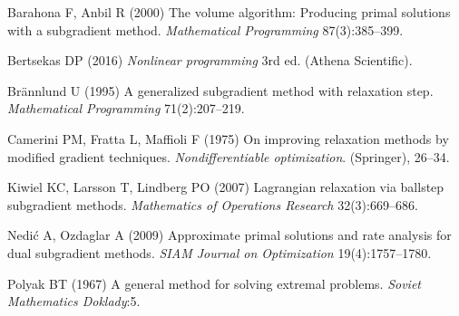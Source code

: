 \documentclass[
  a4paper,
,tablecaptionabove
]{scrartcl}
\numberwithin{equation}{section}
\begin{document}
\hypertarget{refs}{}
\begin{CSLReferences}{1}{0}
  \leavevmode\hypertarget{ref-barahona_volume_2000}{}%
  Barahona F, Anbil R (2000) The volume algorithm: Producing primal
  solutions with a subgradient method. \emph{Mathematical Programming}
  87(3):385--399.

  \leavevmode\hypertarget{ref-bertsekas_nonlinear_2016}{}%
  Bertsekas DP (2016) \emph{Nonlinear programming} 3rd ed. (Athena
  Scientific).

  \leavevmode\hypertarget{ref-brannlund1995generalized}{}%
  Brännlund U (1995) A generalized subgradient method with relaxation
  step. \emph{Mathematical Programming} 71(2):207--219.

  \leavevmode\hypertarget{ref-camerini1975improving}{}%
  Camerini PM, Fratta L, Maffioli F (1975) On improving relaxation methods
  by modified gradient techniques. \emph{Nondifferentiable optimization}.
  (Springer), 26--34.

  \leavevmode\hypertarget{ref-kiwiel_lagrangian_2007}{}%
  Kiwiel KC, Larsson T, Lindberg PO (2007) Lagrangian relaxation via
  ballstep subgradient methods. \emph{Mathematics of Operations Research}
  32(3):669--686.

  \leavevmode\hypertarget{ref-nedic_approximate_2009}{}%
  Nedić A, Ozdaglar A (2009) Approximate primal solutions and rate
  analysis for dual subgradient methods. \emph{SIAM Journal on
    Optimization} 19(4):1757--1780.

  \leavevmode\hypertarget{ref-polyak_general_1967}{}%
  Polyak BT (1967) A general method for solving extremal problems.
  \emph{Soviet Mathematics Doklady}:5.

\end{CSLReferences}
\end{document}

